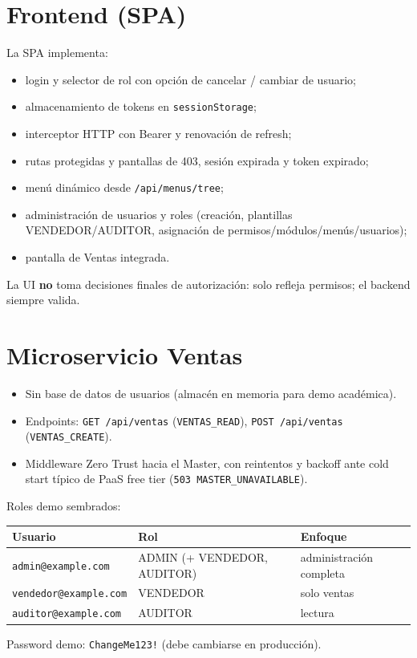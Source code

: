 \documentclass[12pt,a4paper]{article}
\begin{document}
\section{Frontend (SPA)}
La SPA implementa:
\begin{itemize}[leftmargin=1.5em]
  \item login y selector de rol con opción de cancelar / cambiar de usuario;
  \item almacenamiento de tokens en \texttt{sessionStorage};
  \item interceptor HTTP con Bearer y renovación de refresh;
  \item rutas protegidas y pantallas de 403, sesión expirada y token expirado;
  \item menú dinámico desde \texttt{/api/menus/tree};
  \item administración de usuarios y roles (creación, plantillas VENDEDOR/AUDITOR,
        asignación de permisos/módulos/menús/usuarios);
  \item pantalla de Ventas integrada.
\end{itemize}

La UI \textbf{no} toma decisiones finales de autorización: solo refleja permisos;
el backend siempre valida.

\section{Microservicio Ventas}
\begin{itemize}[leftmargin=1.5em]
  \item Sin base de datos de usuarios (almacén en memoria para demo académica).
  \item Endpoints: \texttt{GET /api/ventas} (\texttt{VENTAS\_READ}),
        \texttt{POST /api/ventas} (\texttt{VENTAS\_CREATE}).
  \item Middleware Zero Trust hacia el Master, con reintentos y backoff ante
        cold start típico de PaaS free tier (\texttt{503 MASTER\_UNAVAILABLE}).
\end{itemize}

Roles demo sembrados:
\begin{center}
\begin{tabular}{@{}lll@{}}
\toprule
\textbf{Usuario} & \textbf{Rol} & \textbf{Enfoque} \\
\midrule
\texttt{admin@example.com} & ADMIN (+ VENDEDOR, AUDITOR) & administración completa \\
\texttt{vendedor@example.com} & VENDEDOR & solo ventas \\
\texttt{auditor@example.com} & AUDITOR & lectura \\
\bottomrule
\end{tabular}
\end{center}
Password demo: \texttt{ChangeMe123!} (debe cambiarse en producción).
\end{document}
